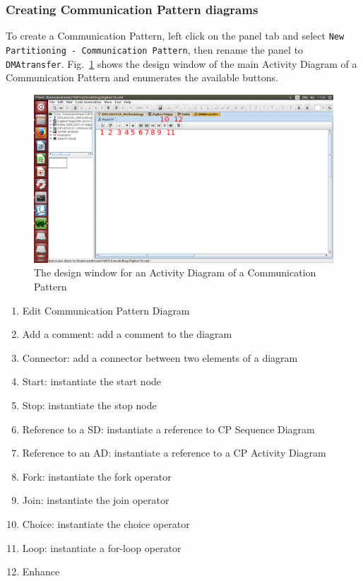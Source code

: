 \documentclass{llncs}
\newcommand{\screenshotsize}{1.0\textwidth}
\begin{document}
\subsubsection{Creating Communication Pattern diagrams}
%
To create a Communication Pattern, left click on the panel tab and select \texttt{New Partitioning - Communication
Pattern}, then rename the panel to \texttt{DMAtransfer}. Fig.~\ref{fig:CPWindow1} shows the design window of the main
Activity Diagram of a Communication Pattern and enumerates the available buttons.
%
\begin{figure}[!htbp]
	\centering
	\includegraphics[width=\screenshotsize]{figures/screenshot/CPWindow1.png}
	\caption{The design window for an Activity Diagram of a Communication Pattern}
	\label{fig:CPWindow1}
\end{figure}
%
\begin{enumerate}
	\item Edit Communication Pattern Diagram
	\item Add a comment: add a comment to the diagram
	\item Connector: add a connector between two elements of a diagram
	\item Start: instantiate the start node
	\item Stop: instantiate the stop node
	\item Reference to a SD: instantiate a reference to CP Sequence Diagram
	\item Reference to an AD: instantiate a reference to a CP Activity Diagram
	\item Fork: instantiate the fork operator
	\item Join: instantiate the join operator
	\item Choice: instantiate the choice operator
	\item Loop: instantiate a for-loop operator
	\item Enhance
\end{enumerate}
\end{document}
